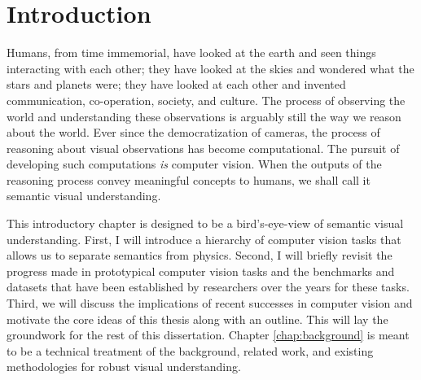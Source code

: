 \chapter{Introduction}
\label{chap:introduction}
Humans, from time immemorial, have looked at the earth and seen things interacting with each other; they have looked at the skies and wondered what the stars and planets were; they have looked at each other and invented communication, co-operation, society, and culture.
The process of observing the world and understanding these observations is arguably still the way we reason about the world.
Ever since the democratization of cameras, the process of reasoning about visual observations has become computational.
The pursuit of developing such computations \textit{is} computer vision.
When the outputs of the reasoning process convey meaningful concepts to humans, we shall call it semantic visual understanding.

This introductory chapter is designed to be a bird's-eye-view of semantic visual understanding.
First, I will introduce a hierarchy of computer vision tasks that allows us to separate semantics from physics.
Second, I will briefly revisit the progress made in prototypical computer vision tasks and the benchmarks and datasets that have been established by researchers over the years for these tasks.
Third, we will discuss the implications of recent successes in computer vision and motivate the core ideas of this thesis along with an outline.
This will lay the groundwork for the rest of this dissertation.
Chapter \ref{chap:background} is meant to be a technical treatment of the background, related work, and existing methodologies for robust visual understanding.

